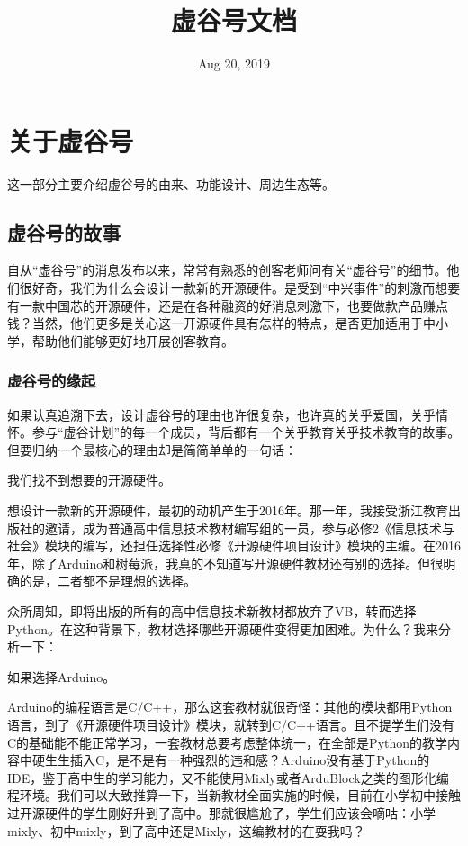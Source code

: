 \documentclass[letterpaper,10pt,english]{sphinxmanual}
\title{虚谷号文档}
\date{Aug 20, 2019}
\author{}
\begin{document}
\maketitle
\sphinxtableofcontents
{}\label{\detokenize{contents::doc}}



\chapter{关于虚谷号}
\label{\detokenize{01.about/index::doc}}\label{\detokenize{01.about/index:id1}}
这一部分主要介绍虚谷号的由来、功能设计、周边生态等。


\section{虚谷号的故事}
\label{\detokenize{01.about/1.1-story::doc}}\label{\detokenize{01.about/1.1-story:id1}}
自从“虚谷号”的消息发布以来，常常有熟悉的创客老师问有关“虚谷号”的细节。他们很好奇，我们为什么会设计一款新的开源硬件。是受到“中兴事件”的刺激而想要有一款中国芯的开源硬件，还是在各种融资的好消息刺激下，也要做款产品赚点钱？当然，他们更多是关心这一开源硬件具有怎样的特点，是否更加适用于中小学，帮助他们能够更好地开展创客教育。


\subsection{虚谷号的缘起}
\label{\detokenize{01.about/1.1-story:id2}}
如果认真追溯下去，设计虚谷号的理由也许很复杂，也许真的关乎爱国，关乎情怀。参与“虚谷计划”的每一个成员，背后都有一个关乎教育关乎技术教育的故事。但要归纳一个最核心的理由却是简简单单的一句话：

我们找不到想要的开源硬件。

想设计一款新的开源硬件，最初的动机产生于2016年。那一年，我接受浙江教育出版社的邀请，成为普通高中信息技术教材编写组的一员，参与必修2《信息技术与社会》模块的编写，还担任选择性必修《开源硬件项目设计》模块的主编。在2016年，除了Arduino和树莓派，我真的不知道写开源硬件教材还有别的选择。但很明确的是，二者都不是理想的选择。

众所周知，即将出版的所有的高中信息技术新教材都放弃了VB，转而选择Python。在这种背景下，教材选择哪些开源硬件变得更加困难。为什么？我来分析一下：

如果选择Arduino。

Arduino的编程语言是C/C++，那么这套教材就很奇怪：其他的模块都用Python语言，到了《开源硬件项目设计》模块，就转到C/C++语言。且不提学生们没有C的基础能不能正常学习，一套教材总要考虑整体统一，在全部是Python的教学内容中硬生生插入C，是不是有一种强烈的违和感？Arduino没有基于Python的IDE，鉴于高中生的学习能力，又不能使用Mixly或者ArduBlock之类的图形化编程环境。我们可以大致推算一下，当新教材全面实施的时候，目前在小学初中接触过开源硬件的学生刚好升到了高中。那就很尴尬了，学生们应该会嘀咕：小学mixly、初中mixly，到了高中还是Mixly，这编教材的在耍我吗？
\end{document}
